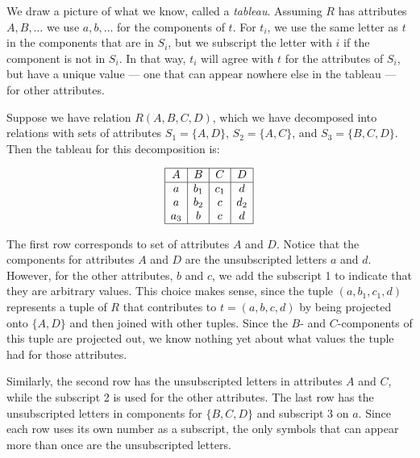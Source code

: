   We draw a picture of what we know, called a \emph{tableau}. Assuming $R$ has attributes $A,B,\ldots$ we use $a,b,\ldots$ for the components of $t$. For $t_i$, we use the same letter as $t$ in the components that are in $S_i$, but we subscript the letter with $i$ if the component is not in $S_i$. In that way, $t_i$ will agree with $t$ for the attributes of $S_i$, but have a unique value — one that can appear nowhere else in the tableau — for other attributes.

  \begin{example}
    \label{ex:lossless-decomposition-of-a-relation}
    Suppose we have relation $R(A,B,C,D)$, which we have decomposed into relations with sets of attributes $S_1 = \{A,D\}$, $S_2 = \{A,C\}$, and $S_3 = \{B,C,D\}$. Then the tableau for this decomposition is:

    \begin{equation}
      \begin{array}{|c|c|c|c|}
      \hline
      A & B & C & D \\
      \hline
      a & b_1 & c_1 & d \\
      a & b_2 & c & d_2 \\
      a_3 & b & c & d \\
      \hline
      \end{array}
    \end{equation}

    The first row corresponds to set of attributes $A$ and $D$. Notice that the components for attributes $A$ and $D$ are the unsubscripted letters $a$ and $d$. However, for the other attributes, $b$ and $c$, we add the subscript 1 to indicate that they are arbitrary values. This choice makes sense, since the tuple $(a,b_1,c_1,d)$ represents a tuple of $R$ that contributes to $t = (a,b,c,d)$ by being projected onto $\{A,D\}$ and then joined with other tuples. Since the $B$- and $C$-components of this tuple are projected out, we know nothing yet about what values the tuple had for those attributes.

    Similarly, the second row has the unsubscripted letters in attributes $A$ and $C$, while the subscript 2 is used for the other attributes. The last row has the unsubscripted letters in components for $\{B,C,D\}$ and subscript 3 on $a$. Since each row uses its own number as a subscript, the only symbols that can appear more than once are the unsubscripted letters.
  \end{example}

